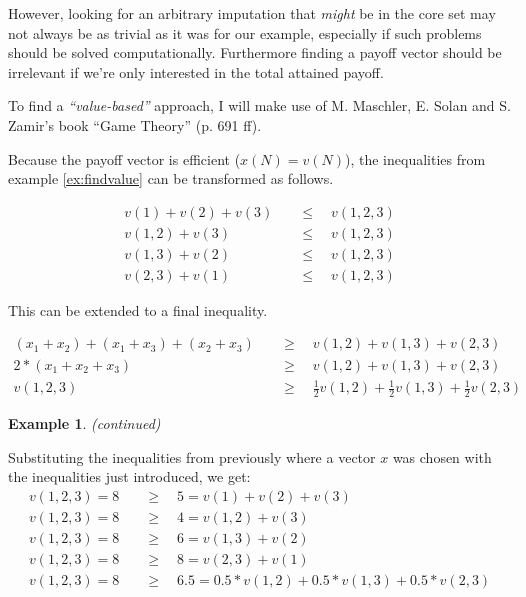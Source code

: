 \documentclass[10pt,a4paper,titlepage]{article}
\theoremstyle{plain}
\theoremstyle{definition}
\newtheorem{example}[thm]{Example} %
\begin{document}
However, looking for an arbitrary imputation that \textit{might} be in the core set may not always be as trivial as it was for our example, especially if such problems should be solved computationally. Furthermore finding a payoff vector should be irrelevant if we're only interested in the total attained payoff.

To find a \textit{\enquote{value-based}} approach, I will make use of M. Maschler, E. Solan and S. Zamir's book \enquote{Game Theory} \cite{maschler} (p. 691 ff).

Because the payoff vector is efficient ($x(N) = v(N)$), the inequalities from example \ref{ex:findvalue} can be transformed as follows.

\begin{align}
    v(1) + v(2) + v(3) &\quad\leq\quad v(1, 2, 3)\\
    v(1, 2) + v(3) &\quad\leq\quad v(1, 2, 3)\\
    v(1, 3) + v(2) &\quad\leq\quad v(1, 2, 3)\\
    v(2, 3) + v(1) &\quad\leq\quad v(1, 2, 3)
\end{align}

This can be extended to a final inequality.

\begin{align*}
    (x_1+x_2)+(x_1+x_3)+(x_2+x_3) &\quad \geq \quad v(1, 2) + v(1, 3) + v(2, 3)\\[6pt]
    2*(x_1+x_2+x_3) &\quad \geq \quad v(1, 2) + v(1, 3) + v(2, 3)\\
    v(1, 2, 3) &\quad \geq \quad \frac{1}{2} v(1, 2) + \frac{1}{2} v(1, 3) + \frac{1}{2} v(2, 3)
\end{align*}

\addtocounter{thm}{-1}
\begin{example}\label{ex:valuebased}
    \textit{(continued)}

    Substituting the inequalities from previously where a vector $x$ was chosen with the inequalities just introduced, we get:
    \begin{align*}
        v(1, 2, 3) = 8\quad & \geq \quad 5 = v(1) + v(2) + v(3)\\
        v(1, 2, 3) = 8\quad & \geq \quad 4 = v(1, 2) + v(3)\\
        v(1, 2, 3) = 8\quad & \geq \quad 6 = v(1, 3) + v(2)\\
        v(1, 2, 3) = 8\quad & \geq \quad 8 = v(2, 3) + v(1)\\
        v(1, 2, 3) = 8\quad & \geq \quad 6.5 = 0.5*v(1, 2) + 0.5*v(1, 3) + 0.5*v(2, 3)
    \end{align*}
\end{example}
\end{document}
